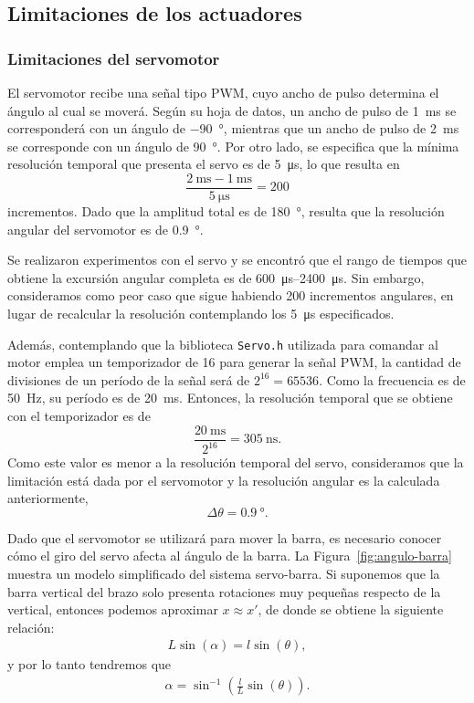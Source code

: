 \subsection{Limitaciones de los actuadores}

\subsubsection{Limitaciones del servomotor}

El servomotor recibe una señal tipo PWM, cuyo ancho de pulso determina el ángulo al cual se moverá. Según su hoja de datos, un ancho de pulso de \qty{1}{\ms} se corresponderá con un ángulo de \qty{-90}{\degree}, mientras que un ancho de pulso de \qty{2}{\ms} se corresponde con un ángulo de \qty{90}{\degree}. Por otro lado, se especifica que la mínima resolución temporal que presenta el servo es de \qty{5}{\us}, lo que resulta en
$$\frac{\qty{2}{\ms} - \qty{1}{\ms}}{\qty{5}{\us}} = 200$$
incrementos. Dado que la amplitud total es de \qty{180}{\degree}, resulta que la resolución angular del servomotor es de \qty{0.9}{\degree}.

Se realizaron experimentos con el servo y se encontró que el rango de tiempos que obtiene la excursión angular completa es de \qtyrange{600}{2400}{\us}. Sin embargo, consideramos como peor caso que sigue habiendo 200 incrementos angulares, en lugar de recalcular la resolución contemplando los \qty{5}{\us} especificados.

Además, contemplando que la biblioteca \verb|Servo.h| utilizada para comandar al motor emplea un temporizador de \qty{16}{\bit} para generar la señal PWM, la cantidad de divisiones de un período de la señal será de $2^{16} = 65536$. Como la frecuencia es de \qty{50}{\Hz}, su período es de \qty{20}{\ms}. Entonces, la resolución temporal que se obtiene con el temporizador es de
$$\frac{\qty{20}{\ms}}{2^{16}} = \qty{305}{\ns}.$$
Como este valor es menor a la resolución temporal del servo, consideramos que la limitación está dada por el servomotor y la resolución angular es la calculada anteriormente,
$$\Delta\theta = \qty{0.9}{\degree}.$$

Dado que el servomotor se utilizará para mover la barra, es necesario conocer cómo el giro del servo afecta al ángulo de la barra. La Figura~\ref{fig:angulo-barra} muestra un modelo simplificado del sistema servo-barra. Si suponemos que la barra vertical del brazo solo presenta rotaciones muy pequeñas respecto de la vertical, entonces podemos aproximar $x \approx x'$, de donde se obtiene la siguiente relación:
\begin{align*}
    L \sin(\alpha) = l \sin(\theta),
\end{align*}
y por lo tanto tendremos que
\begin{align*}
    \alpha = \sin^{-1}\left(\frac{l}{L} \sin(\theta)\right).
\end{align*}

